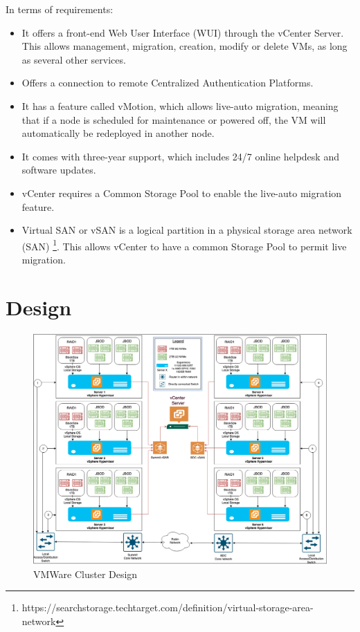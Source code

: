 In terms of requirements:
\begin{itemize}
  \item It offers a front-end Web User Interface (WUI) through the vCenter Server. This allows management, migration, creation, modify or delete VMs, as long as several other services.
  \item Offers a connection to remote Centralized Authentication Platforms.
  \item It has a feature called vMotion, which allows live-auto migration, meaning that if a node is scheduled for maintenance or powered off, the VM will automatically be redeployed in another node.
  \item It comes with three-year support, which includes 24/7 online helpdesk and software updates.
  \item vCenter requires a Common Storage Pool to enable the live-auto migration feature.
  \item Virtual SAN or vSAN is a logical partition in a physical storage area network (SAN) \footnote{https://searchstorage.techtarget.com/definition/virtual-storage-area-network}. This allows vCenter to have a common Storage Pool to permit live migration.
\end{itemize}

\newpage
\section{Design}

\begin{figure}
  \includegraphics[width=12cm]{images/vmware_cluster_design.png}
  \centering
  \caption{VMWare Cluster Design}
\end{figure}

